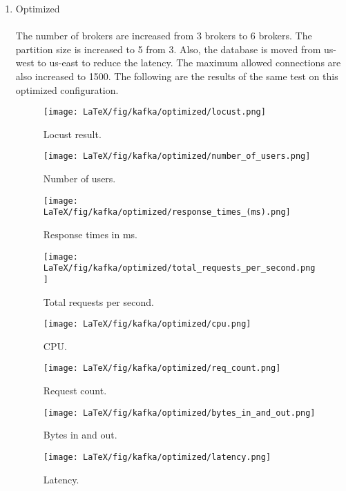 \documentclass{IEEEtran}
\begin{document}
\begin{enumerate}
\begin{enumerate}
        
        \item Optimized \\\\
        The number of brokers are increased from 3 brokers to 6 brokers. The partition size is increased to 5 from 3. Also, the database is moved from us-west to us-east to reduce the latency. The maximum allowed connections are also increased to 1500. The following are the results of the same test on this optimized configuration.
        \begin{figure}[H]
        \texttt{[image: LaTeX/fig/kafka/optimized/locust.png]}
        \caption{Locust result.}
    \end{figure}
    \begin{figure}[H]
        \texttt{[image: LaTeX/fig/kafka/optimized/number\_of\_users.png]}
        \caption{Number of users.}
    \end{figure}
    \begin{figure}[H]
        \texttt{[image: LaTeX/fig/kafka/optimized/response\_times\_(ms).png]}
        \caption{Response times in ms.}
    \end{figure}
    \begin{figure}[H]
        \texttt{[image: LaTeX/fig/kafka/optimized/total\_requests\_per\_second.png]}
        \caption{Total requests per second.}
    \end{figure}
    \begin{figure}[H]
        \texttt{[image: LaTeX/fig/kafka/optimized/cpu.png]}
        \caption{CPU.}
    \end{figure}
    \begin{figure}[H]
        \texttt{[image: LaTeX/fig/kafka/optimized/req\_count.png]}
        \caption{Request count.}
    \end{figure}
    \begin{figure}[H]
        \texttt{[image: LaTeX/fig/kafka/optimized/bytes\_in\_and\_out.png]}
        \caption{Bytes in and out.}
    \end{figure}
    \begin{figure}[H]
        \texttt{[image: LaTeX/fig/kafka/optimized/latency.png]}
        \caption{Latency.}
    \end{figure}
    \end{enumerate}
\end{enumerate}
\end{document}
